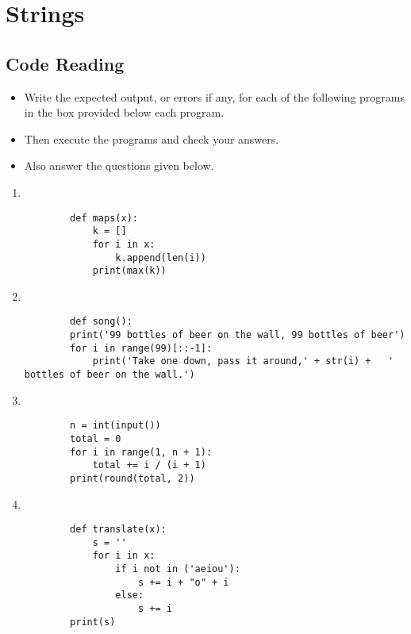 \documentclass[11pt,a4paper]{article}
\def\AnswerBox{\fbox{\begin{minipage}{4in}\hfill\vspace{0.5in}\end{minipage}}}
\begin{document}
\section*{Strings}

\subsection*{Code Reading}

\begin{itemize}
    \item Write the expected output, or errors if any, for each of the following programs in the box provided below each program.
    \item Then execute the programs and check your answers.
    \item Also answer the questions given below.
\end{itemize}

\begin{enumerate}[label=\bfseries Program \arabic*:]

    \item ~
    \begin{lstlisting}
        def maps(x):
            k = []
            for i in x:
                k.append(len(i))
            print(max(k))
    \end{lstlisting}
    \AnswerBox
    \item ~
    \begin{lstlisting}
        def song():
        print('99 bottles of beer on the wall, 99 bottles of beer')
        for i in range(99)[::-1]:
            print('Take one down, pass it around,' + str(i) +   ' bottles of beer on the wall.')
    \end{lstlisting}
    \AnswerBox
    \item ~
    \begin{lstlisting}
        n = int(input())
        total = 0
        for i in range(1, n + 1):
            total += i / (i + 1)
        print(round(total, 2))
    \end{lstlisting}
    \AnswerBox
    \item ~
    \begin{lstlisting}
        def translate(x):
            s = ''
            for i in x:
                if i not in ('aeiou'):
                    s += i + "o" + i
                else:
                    s += i 
        print(s) 
    \end{lstlisting}
    \AnswerBox
\end{enumerate}
\end{document}
